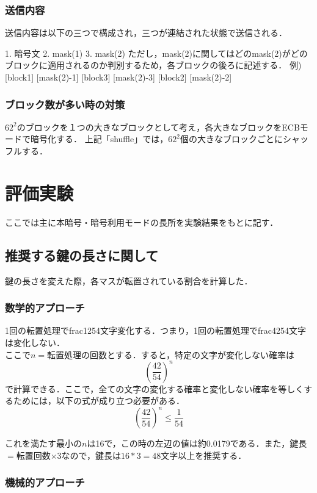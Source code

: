\documentclass[a4p]{jarticle}
\begin{document}
\subsubsection{送信内容}
送信内容は以下の三つで構成され，三つが連結された状態で送信される．

1. 暗号文
2. mask(1)
3. mask(2)
ただし，mask(2)に関してはどのmask(2)がどのブロックに適用されるのか判別するため，各ブロックの後ろに記述する．
例) [block1] [mask(2)-1] [block3] [mask(2)-3] [block2] [mask(2)-2]

\subsubsection{ブロック数が多い時の対策}
\(62^2\)のブロックを１つの大きなブロックとして考え，各大きなブロックをECBモードで暗号化する．
上記「shuffle」では，\(62^2\)個の大きなブロックごとにシャッフルする．

\section{評価実験}
ここでは主に本暗号・暗号利用モードの長所を実験結果をもとに記す．
\subsection{推奨する鍵の長さに関して}
鍵の長さを変えた際，各マスが転置されている割合を計算した．\\

\subsubsection{数学的アプローチ}
1回の転置処理でfrac{12}{54}文字変化する．つまり，1回の転置処理でfrac{42}{54}文字は変化しない．\\
ここで$n=$転置処理の回数とする．すると，特定の文字が変化しない確率は
\[\left(\frac{42}{54}\right)^n\]
で計算できる．ここで，全ての文字の変化する確率と変化しない確率を等しくするためには，以下の式が成り立つ必要がある．
\[\left(\frac{42}{54}\right)^n \leq \frac{1}{54}\]

これを満たす最小の$n$は16で，この時の左辺の値は約0.0179である．また，鍵長$=$転置回数$\times 3$なので，鍵長は$16*3=48$文字以上を推奨する．

\subsubsection{機械的アプローチ}
\end{document}
